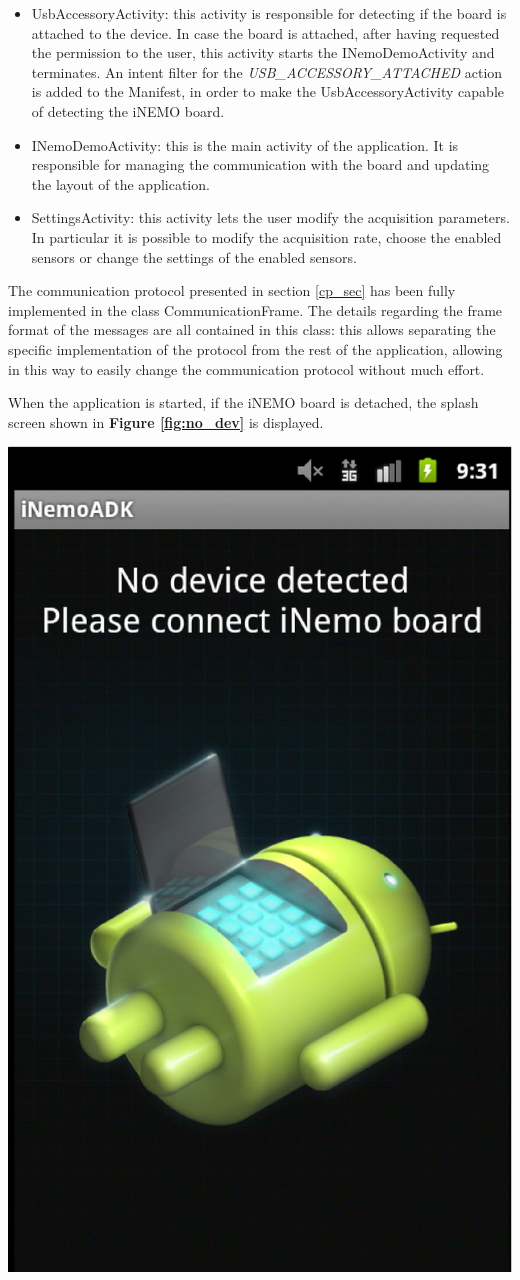 \begin{itemize}
	\item UsbAccessoryActivity: this activity is responsible for detecting if the board is attached to the device. In case the board is attached, after having requested the permission to the user, this activity starts the INemoDemoActivity and terminates. An intent filter for the \textit{USB\_ACCESSORY\_ATTACHED} action is added to the Manifest, in order to make the UsbAccessoryActivity capable of detecting the iNEMO board.
	\item INemoDemoActivity: this is the main activity of the application. It is responsible for managing the communication with the board and updating the layout of the application.
	\item SettingsActivity: this activity lets the user modify the acquisition parameters. In particular it is possible to modify the acquisition rate, choose the enabled sensors or change the settings of the enabled sensors.

\end{itemize}


The communication protocol presented in section \ref{cp_sec} has been fully implemented in the class CommunicationFrame. The details regarding the frame format of the messages are all contained in this class: this allows separating the specific implementation of the protocol from the rest of the application, allowing in this way to easily change the communication protocol without much effort.


When the application is started, if the iNEMO board is detached, the splash screen shown in {\bf Figure \ref{fig:no_dev}} is displayed.

\begin{center}
	\includegraphics[width=0.6\linewidth]{pics/no_dev.eps}
	\label{fig:no_dev}
\end{center}

